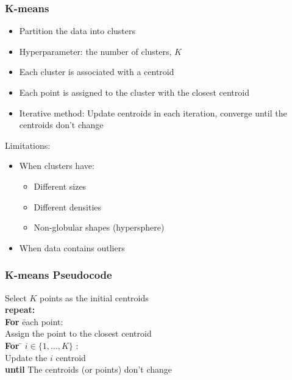 \documentclass[aspectratio=169, 10pt]{beamer}
\begin{document}
\begin{frame}
    \frametitle{K-means}
    
    \begin{itemize}
        \item Partition the data into clusters
        \item Hyperparameter: the number of clusters, $K$
        \item Each cluster is associated with a centroid
        \item Each point is assigned to the cluster with the closest centroid
        \item Iterative method: Update centroids in each iteration, converge until the centroids don't change
    \end{itemize}
    
    Limitations:
    \begin{itemize}
        \item When clusters have:
            \begin{itemize}
                \item Different sizes
                \item Different densities
                \item Non-globular shapes (hypersphere)
            \end{itemize}
        \item When data contains outliers
    \end{itemize}
\end{frame}

\begin{frame}
    \frametitle{K-means Pseudocode}
    
    \hrulefill \par

    \begin{tabbing}
        Select $K$ points as the initial centroids \\
        \textbf{repeat:}\= \\
        \> \textbf{For} \= each point: \\
        \> \> Assign the point to the closest centroid \\
        \> \textbf{For} \= $i \in \{1, \ldots, K\}$ : \\
        \> \> Update the $i$ centroid \\
        \textbf{until} The centroids (or points) don't change
    \end{tabbing}

    \hrulefill \par
    
\end{frame}
\end{document}
